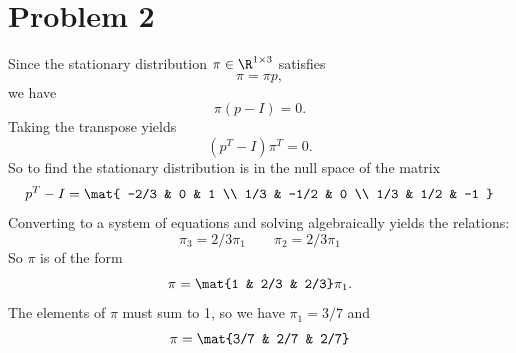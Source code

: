 \documentclass{homework}
\begin{document}
\section{Problem 2}
Since the stationary distribution $\pi \in \R^{1 \times 3}$ satisfies
\begin{equation*}
    \pi = \pi p,
\end{equation*}
we have
\begin{equation*}
    \pi (p - I) = 0.
\end{equation*}
Taking the transpose yields
\begin{equation*}
    (p^T - I) \pi^T = 0.
\end{equation*}
So to find the stationary distribution is in the null space of the matrix
\begin{equation*}
    p^T - I = \mat{
        -2/3 & 0 & 1 \\
        1/3 & -1/2 & 0 \\
        1/3 & 1/2 & -1
    }
\end{equation*}
Converting to a system of equations and solving algebraically yields the 
relations:
\begin{equation*}
    \pi_3 = 2/3 \pi_1 \qquad \pi_2 = 2/3 \pi_1
\end{equation*}
So $\pi$ is of the form
\begin{equation*}
    \pi = \mat{1 & 2/3 & 2/3} \pi_1.
\end{equation*}
The elements of $\pi$ must sum to 1, so we have $\pi_1 = 3/7$ and
\begin{equation*}
    \pi = \mat{3/7 & 2/7 & 2/7}
\end{equation*}
\end{document}
